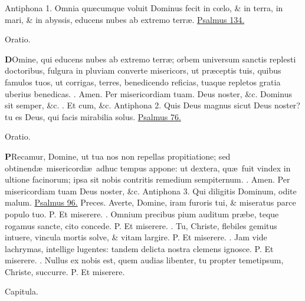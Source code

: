 \documentclass[letter,11pt]{book}
\makeatletter
\DeclareRobustCommand{\Vbar}{\vers@resp{-0.1em}{V}}
\DeclareRobustCommand{\Rbar}{\vers@resp{0pt}{R}}
\newcommand{\vers@resp@sym}{\raisebox{0.2ex}{\rotatebox[origin=c]{-20}{$\m@th\rceil$}}}
\newcommand{\vers@resp}[2]{%
  {\ooalign{\hidewidth\kern#1\vers@resp@sym\hidewidth\cr#2\cr}}%
}%
\def\P{\color{Red} P. \color{black}}
\def\V{\color{Red} \Vbar . \color{black}}
\def\R{\color{Red} \Rbar . \color{black}}
\makeatother
\begin{document}
\begin{multicols*}{2}
\newline \color{Red} Antiphona 1. \color{black} Omnia qu\ae cumque voluit Dominus fecit in c\oe lo, \& in terra, in mari, \& in abyssis, educens nubes ab extremo terr\ae . \color{Red} \hyperlink{ps134}{Psalmus 134.} \color{black}
\vspace{-.5em} \begin{center} \color{Red} Oratio. \color{black} \end{center} \vspace{-.5em}
\lettrine[lines=2]{\bfseries \color{Red} D}{}Omine, qui educens nubes ab extremo terr\ae ; orbem universum sanctis replesti doctoribus, fulgura in pluviam converte misericors, ut pr\ae ceptis tuis, quibus famulos tuos, ut corrigas, terres, benedicendo reficias, tuaque repletos gratia uberius benedicas. \R Amen. Per misericordiam tuam. Deus noster, \&c. Dominus sit semper, \&c. \R Et cum, \&c.
\newline \color{Red} Antiphona 2. \color{black} Quis Deus magnus sicut Deus noster? tu es Deus, qui facis mirabilia solus. \color{Red} \hyperlink{ps76}{Psalmus 76.} \color{black}
\vspace{-.5em} \begin{center} \color{Red} Oratio. \color{black} \end{center} \vspace{-.5em}
\lettrine[lines=2]{\bfseries \color{Red} P}{}Recamur, Domine, ut tua nos non repellas propitiatione; sed obtinend\ae \ misericordi\ae \ adhuc tempus appone: ut dextera, qu\ae \ fuit vindex in ultione facinorum; ipsa sit nobis contritis remedium sempiternum. \R Amen. Per misericordiam tuam Deus noster, \&c.
\newline \color{Red} Antiphona 3. \color{black} Qui diligitis Dominum, odite malum. \color{Red} \hyperlink{ps96}{Psalmus 96.} \color{black}
\newline \color{Red} Preces. \color{black} Averte, Domine, iram furoris tui, \& miseratus parce populo tuo. \P Et miserere. \V Omnium precibus pium auditum pr\ae be, teque rogamus sancte, cito concede. \P Et miserere. \V Tu, Christe, flebiles gemitus intuere, vincula mortis solve, \& vitam largire. \P Et miserere. \V Jam vide lachrymas, intellige lugentes: tandem delicta nostra clemens ignosce. \P Et miserere. \V Nullus ex nobis est, quem audias libenter, tu propter temetipsum, Christe, succurre. \P Et miserere.
\vspace{-.5em} \begin{center} \color{Red} Capitula. \color{black} \end{center} \vspace{-.5em}

\end{multicols*}
\end{document}
